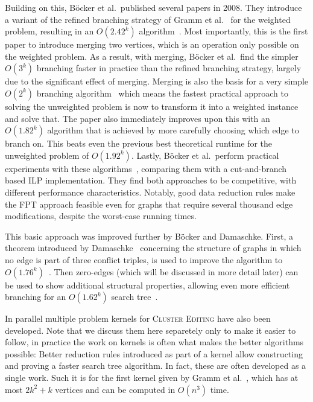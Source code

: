 \documentclass{article}
\theoremstyle{definition}
\begin{document}
Building on this, Böcker et al.\ published several papers in 2008. They introduce a variant of the
refined branching strategy of Gramm et al.~\cite{Gramm} for the weighted problem, resulting in an
$O(2.42^k)$ algorithm~\cite{AnApproach}. Most importantly, this is the first paper to introduce
merging two vertices, which is an operation only possible on the weighted problem. As a result, with
merging, Böcker et al.\ find the simpler $O(3^k)$ branching faster in practice than the refined
branching strategy, largely due to the significant effect of merging. Merging is also the basis for
a very simple $O(2^k)$ branching algorithm~\cite{GoingWeighted} which means the fastest practical
approach to solving the unweighted problem is now to transform it into a weighted instance and solve
that.  The paper also immediately improves upon this with an $O(1.82^k)$ algorithm that is achieved
by more carefully choosing which edge to branch on. This beats even the previous best theoretical
runtime for the unweighted problem of $O(1.92^k)$. Lastly, Böcker et al.\ perform practical
experiments with these algorithms~\cite{ExactAlgos}, comparing them with a cut-and-branch based ILP
implementation.  They find both approaches to be competitive, with different performance
characteristics. Notably, good data reduction rules make the FPT approach feasible even for graphs
that require several thousand edge modifications, despite the worst-case running times.

This basic approach was improved further by Böcker and Damaschke. First, a theorem introduced by
Damaschke~\cite{BoundedDegree} concerning the structure of graphs in which no edge is part of three
conflict triples, is used to improve the algorithm to $O(1.76^k)$~\cite{EvenFaster}. Then zero-edges
(which will be discussed in more detail later) can be used to show additional structural properties,
allowing even more efficient branching for an $O(1.62^k)$ search tree~\cite{GoldenRatio}.

In parallel multiple problem kernels for \textsc{Cluster Editing} have also been developed. Note
that we discuss them here separetely only to make it easier to follow, in practice the work on
kernels is often what makes the better algorithms possible: Better reduction rules introduced as
part of a kernel allow constructing and proving a faster search tree algorithm. In fact, these are
often developed as a single work. Such it is for the first kernel given by Gramm et al.~\cite{Gramm},
which has at most $2k^2 + k$ vertices and can be computed in $O(n^3)$ time.
\end{document}
